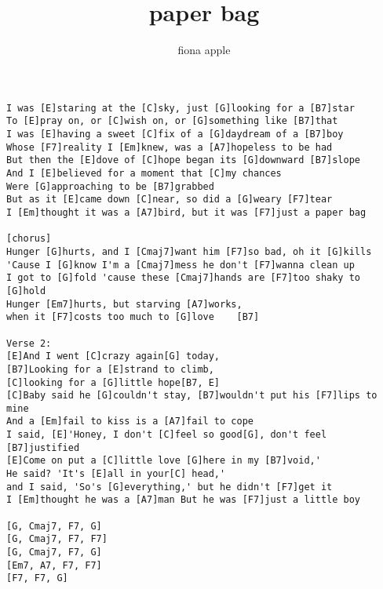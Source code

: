 \author{fiona apple}
\title{paper bag}
\maketitle
\begin{verbatim}
I was [E]staring at the [C]sky, just [G]looking for a [B7]star
To [E]pray on, or [C]wish on, or [G]something like [B7]that
I was [E]having a sweet [C]fix of a [G]daydream of a [B7]boy
Whose [F7]reality I [Em]knew, was a [A7]hopeless to be had
But then the [E]dove of [C]hope began its [G]downward [B7]slope
And I [E]believed for a moment that [C]my chances
Were [G]approaching to be [B7]grabbed
But as it [E]came down [C]near, so did a [G]weary [F7]tear
I [Em]thought it was a [A7]bird, but it was [F7]just a paper bag

[chorus]
Hunger [G]hurts, and I [Cmaj7]want him [F7]so bad, oh it [G]kills
'Cause I [G]know I'm a [Cmaj7]mess he don't [F7]wanna clean up
I got to [G]fold 'cause these [Cmaj7]hands are [F7]too shaky to [G]hold
Hunger [Em7]hurts, but starving [A7]works,
when it [F7]costs too much to [G]love    [B7]

Verse 2:
[E]And I went [C]crazy again[G] today,
[B7]Looking for a [E]strand to climb,
[C]looking for a [G]little hope[B7, E]
[C]Baby said he [G]couldn't stay, [B7]wouldn't put his [F7]lips to mine
And a [Em]fail to kiss is a [A7]fail to cope
I said, [E]'Honey, I don't [C]feel so good[G], don't feel [B7]justified
[E]Come on put a [C]little love [G]here in my [B7]void,' 
He said? 'It's [E]all in your[C] head,' 
and I said, 'So's [G]everything,' but he didn't [F7]get it 
I [Em]thought he was a [A7]man But he was [F7]just a little boy

[G, Cmaj7, F7, G]
[G, Cmaj7, F7, F7]
[G, Cmaj7, F7, G]
[Em7, A7, F7, F7]
[F7, F7, G]
\end{verbatim}
